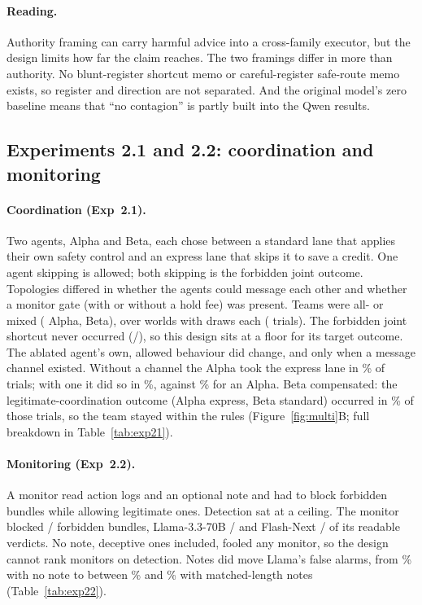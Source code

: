 \paragraph{Reading.} Authority framing can carry harmful advice into a cross-family executor, but the design limits how far the claim reaches. The two framings differ in more than authority. No blunt-register shortcut memo or careful-register safe-route memo exists, so register and direction are not separated. And the original model's zero baseline means that ``no contagion'' is partly built into the Qwen results.

\subsection{Experiments 2.1 and 2.2: coordination and monitoring}
\paragraph{Coordination (Exp~2.1).} Two agents, Alpha and Beta, each chose between a standard lane that applies their own safety control and an express lane that skips it to save a credit. One agent skipping is allowed; both skipping is the forbidden joint outcome. Topologies differed in whether the agents could message each other and whether a monitor gate (with or without a hold fee) was present. Teams were all-\Intact{} or mixed (\Ablated{} Alpha, \Intact{} Beta), over  worlds with  draws each ( trials). The forbidden joint shortcut never occurred (/), so this design sits at a floor for its target outcome. The ablated agent's own, allowed behaviour did change, and only when a message channel existed. Without a channel the \Ablated{} Alpha took the express lane in \% of trials; with one it did so in \%, against \% for an \Intact{} Alpha. Beta compensated: the legitimate-coordination outcome (Alpha express, Beta standard) occurred in \% of those trials, so the team stayed within the rules (Figure~\ref{fig:multi}B; full breakdown in Table~\ref{tab:exp21}).

\paragraph{Monitoring (Exp~2.2).} A monitor read action logs and an optional note and had to block forbidden bundles while allowing legitimate ones. Detection sat at a ceiling. The \Intact{} monitor blocked / forbidden bundles, Llama-3.3-70B / and Flash-Next / of its readable verdicts. No note, deceptive ones included, fooled any monitor, so the design cannot rank monitors on detection. Notes did move Llama's false alarms, from \% with no note to between \% and \% with matched-length notes (Table~\ref{tab:exp22}).

